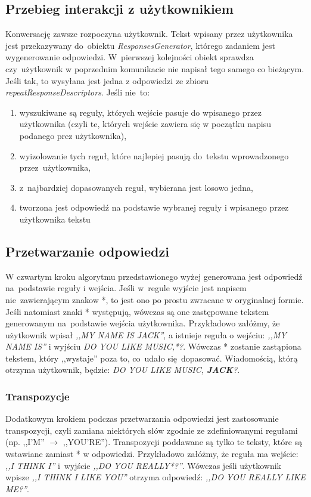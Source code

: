 \documentclass[11pt,a4paper]{article}
\begin{document}
\subsection{Przebieg interakcji z użytkownikiem}
Konwersację zawsze rozpoczyna użytkownik. Tekst wpisany przez użytkownika jest
przekazywany do~obiektu \textit{ResponsesGenerator}, którego zadaniem jest
wygenerowanie odpowiedzi. W~pierwszej kolejności obiekt sprawdza czy~użytkownik
w poprzednim komunikacie nie napisał tego samego co bieżącym. Jeśli tak, to
wysyłana jest jedna z odpowiedzi ze zbioru \textit{repeatResponseDescriptors}.
Jeśli nie~to:
\begin{enumerate}
  \item wyszukiwane są reguły, których wejście pasuje do wpisanego przez
  użytkownika (czyli te, których wejście zawiera się w początku napisu
  podanego prez użytkownika),
  \item wyizolowanie tych reguł, które najlepiej pasują do~tekstu wprowadzonego
  przez~użytkownika,
  \item z~najbardziej dopasowanych reguł, wybierana jest losowo jedna,
  \item tworzona jest odpowiedź na podstawie wybranej reguły i wpisanego przez
  użytkownika tekstu
\end{enumerate}

\subsection{Przetwarzanie odpowiedzi}
W czwartym kroku algorytmu przedstawionego wyżej generowana jest odpowiedź
na~podstawie reguły i wejścia. Jeśli w~regule wyjście jest napisem
nie~zawierającym znakow *, to jest ono po prostu zwracane w oryginalnej formie.
Jeśli natomiast znaki * występują, wówczas są one zastępowane tekstem
generowanym na~podstawie wejścia użytkownika. Przykładowo załóżmy, że użytkownik
wpisał \textit{,,MY NAME IS JACK''}, a istnieje reguła o wejściu: \textit{,,MY
NAME IS''} i wyjściu \textit{DO YOU LIKE MUSIC,*?}. Wówczas * zostanie
zastąpiona tekstem, który ,,wystaje'' poza to, co~udało się~dopasować.
Wiadomością, którą otrzyma użytkownik, będzie: \textit{DO YOU LIKE MUSIC,
\textbf{JACK}?}.

\subsubsection{Transpozycje} Dodatkowym krokiem podczas przetwarzania odpowiedzi
jest zastosowanie transpozycji, czyli zamiana niektórych słów zgodnie ze
zdefiniowanymi regułami (np. ,,I'M'' $\rightarrow$ ,,YOU'RE''). Transpozycji
poddawane są tylko te teksty, które są wstawiane zamiast * w odpowiedzi.
Przykładowo załóżmy, że reguła ma wejście: \textit{,,I THINK I''} i~wyjście
\textit{,,DO YOU REALLY*?''}. Wówczas jeśli użytkownik wpisze \textit{,,I THINK
I LIKE YOU''} otrzyma odpowiedź: \textit{,,DO YOU REALLY LIKE ME?''}.
\end{document}
